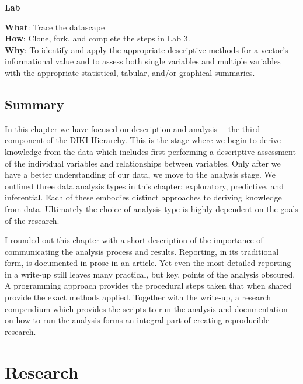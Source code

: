 \documentclass[
  letterpaper,
  krantz1]{latex/krantz-mod}
\theoremstyle{definition}
\theoremstyle{definition}
\theoremstyle{remark}
\begin{document}
\begin{tcolorbox}[enhanced jigsaw, toprule=.15mm, breakable, colback=white, arc=.35mm, left=2mm, colframe=quarto-callout-color-frame, opacityback=0, bottomrule=.15mm, rightrule=.15mm, leftrule=.75mm]

\textbf{ Lab}

\textbf{What}: Trace the datascape\\
\textbf{How}: Clone, fork, and complete the steps in Lab 3.\\
\textbf{Why}: To identify and apply the appropriate descriptive methods
for a vector's informational value and to assess both single variables
and multiple variables with the appropriate statistical, tabular, and/or
graphical summaries.

\end{tcolorbox}

\section*{Summary}\label{summary-2}


In this chapter we have focused on description and analysis ---the third
component of the DIKI Hierarchy. This is the stage where we begin to
derive knowledge from the data which includes first performing a
descriptive assessment of the individual variables and relationships
between variables. Only after we have a better understanding of our
data, we move to the analysis stage. We outlined three data analysis
types in this chapter: exploratory, predictive, and inferential. Each of
these embodies distinct approaches to deriving knowledge from data.
Ultimately the choice of analysis type is highly dependent on the goals
of the research.

I rounded out this chapter with a short description of the importance of
communicating the analysis process and results. Reporting, in its
traditional form, is documented in prose in an article. Yet even the
most detailed reporting in a write-up still leaves many practical, but
key, points of the analysis obscured. A programming approach provides
the procedural steps taken that when shared provide the exact methods
applied. Together with the write-up, a research compendium which
provides the scripts to run the analysis and documentation on how to run
the analysis forms an integral part of creating reproducible research.

\chapter{Research}\label{sec-research-chapter}
\end{document}
